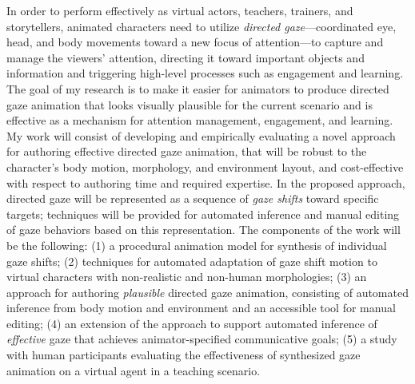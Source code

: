 In order to perform effectively as virtual actors, teachers, trainers, and storytellers, animated characters need to utilize \emph{directed gaze}---coordinated eye, head, and body movements toward a new focus of attention---to capture and manage the viewers' attention, directing it toward important objects and information and triggering high-level processes such as engagement and learning. The goal of my research is to make it easier for animators to produce directed gaze animation that looks visually plausible for the current scenario and is effective as a mechanism for attention management, engagement, and learning. My work will consist of developing and empirically evaluating a novel approach for authoring effective directed gaze animation, that will be robust to the character's body motion, morphology, and environment layout, and cost-effective with respect to authoring time and required expertise. In the proposed approach, directed gaze will be represented as a sequence of \emph{gaze shifts} toward specific targets; techniques will be provided for automated inference and manual editing of gaze behaviors based on this representation. The components of the work will be the following: (1) a procedural animation model for synthesis of individual gaze shifts; (2) techniques for automated adaptation of gaze shift motion to virtual characters with non-realistic and non-human morphologies; (3) an approach for authoring \emph{plausible} directed gaze animation, consisting of automated inference from body motion and environment and an accessible tool for manual editing; (4) an extension of the approach to support automated inference of \emph{effective} gaze that achieves animator-specified communicative goals; (5) a study with human participants evaluating the effectiveness of synthesized gaze animation on a virtual agent in a teaching scenario. 
